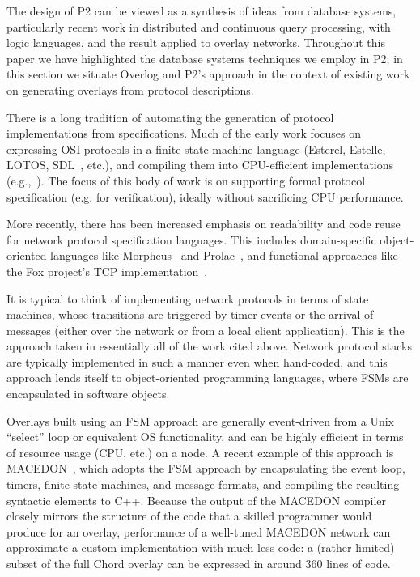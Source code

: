\documentclass[twocolumn,10pt]{article}
\def\Sys{P2\xspace}
\def\Lang{Overlog\xspace}
\begin{document}
The design of \Sys can be viewed as a synthesis of ideas from database
systems, particularly recent work in distributed and continuous query
processing, with logic languages, and the result applied to overlay
networks.   Throughout this paper we have highlighted the database
systems techniques we employ in \Sys; in this section we
situate \Lang and \Sys's approach in the context of existing work on
generating overlays from protocol descriptions. 

There is a long tradition of automating the generation of protocol
implementations from specifications.  Much of the early work focuses
on expressing OSI protocols in a finite state machine language
(Esterel, Estelle, LOTOS, SDL~\cite{esterel,fdt-book}, etc.), and
compiling them into CPU-efficient implementations
(e.g.,~\cite{dabbous-sigcomm96,vuong-estelle-tose88}).  The focus of
this body of work is on supporting formal protocol specification
(e.g. for verification), ideally without sacrificing CPU performance.

More recently, there has been increased emphasis on readability and
code reuse for network protocol specification languages.  This
includes domain-specific object-oriented languages like
Morpheus~\cite{morpheus} and Prolac~\cite{prolac}, and functional
approaches like the Fox project's TCP implementation~\cite{fox}.

It is typical to think of implementing network protocols in terms of
state machines, whose transitions are triggered by timer events or the
arrival of messages (either over the network or from a local client
application).  This is the approach taken in essentially all of the
work cited above.  Network protocol stacks are typically implemented
in such a manner even when hand-coded, and this approach lends itself
to object-oriented programming languages, where FSMs are encapsulated
in software objects.  

Overlays built using an FSM approach are generally event-driven from a
Unix ``select'' loop or equivalent OS functionality, and can be highly
efficient in terms of resource usage (CPU, etc.) on a node.  A recent
example of this approach is MACEDON~\cite{rodriguez04macedon}, which
adopts the FSM approach by
encapsulating the event loop, timers, finite state 
machines, and message formats, and compiling the resulting syntactic
elements to C++.   Because the output of the MACEDON compiler closely
mirrors the structure of the code that a skilled programmer would
produce for an overlay, performance of a well-tuned MACEDON network
can approximate a custom implementation with much less code: a
(rather limited) subset of the full Chord overlay can be expressed in
around 360 lines of code.  
\end{document}
